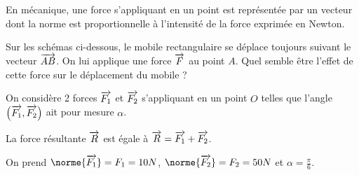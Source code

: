 \documentclass[12pt,openright,twoside,french]{book}
\begin{document}

En mécanique, une force s'appliquant en un point est représentée par un vecteur dont la norme est proportionnelle à l'intensité de la force exprimée en Newton.\medskip

\exo

Sur les schémas ci-dessous, le mobile rectangulaire se déplace toujours suivant le vecteur $\overrightarrow{AB}$. On lui applique une force $\overrightarrow{F}$ au point $A$. Quel semble être l'effet de cette force sur le déplacement du mobile ?

\begin{center}
    \qquad
    \qquad
\end{center}\medskip

\exo

On considère 2 forces $\overrightarrow{F_1}$ et $\overrightarrow{F_2}$ s'appliquant en un point $O$ telles que l'angle $\left(\overrightarrow{F_1} , \overrightarrow{F_2}\right)$ ait pour mesure $\alpha$.\par
La force résultante $\overrightarrow{R}$ est égale à $\overrightarrow{R} = \overrightarrow{F_1} + \overrightarrow{F_2}$.\par

On prend $\norme{\vect{F_1}} = F_1 = 10 N$, $\norme{\vect{F_2}} = F_2 = 50 N$ et $\alpha = \frac\pi 6$.\medskip
\end{document}

